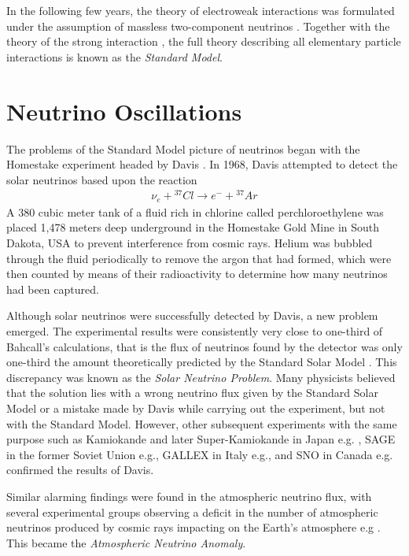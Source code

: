 \documentclass[english]{article}
\begin{document}
    In the following few years, the theory of electroweak interactions was formulated under the assumption of massless two-component neutrinos \cite{glashow1961} \cite{goldstonesalamweinberg1962} \cite{weinberg1967}. Together with the theory of the strong interaction \cite{grosswilczek1973} \cite{politzer1973}, the full theory describing all elementary particle interactions is known as the \textit{Standard Model}.

\section{Neutrino Oscillations}
	The problems of the Standard Model picture of neutrinos began with the Homestake experiment headed by Davis \cite{davis1968}. In 1968, Davis attempted to detect the solar neutrinos based upon the reaction
    \begin{gather}
    	\nu_{e} + {}^{37} Cl \rightarrow e^{-} + {}^{37} Ar
    \end{gather}
    A 380 cubic meter tank of a fluid rich in chlorine called perchloroethylene was placed 1,478 meters deep underground in the Homestake Gold Mine in South Dakota, USA to prevent interference from cosmic rays. Helium was bubbled through the fluid periodically to remove the argon that had formed, which were then counted by means of their radioactivity to determine how many neutrinos had been captured.
    
    Although solar neutrinos were successfully detected by Davis, a new problem emerged. The experimental results were consistently very close to one-third of Bahcall's calculations, that is the flux of neutrinos found by the detector was only one-third the amount theoretically predicted by the Standard Solar Model \cite{davis1998} \cite{bahcall2004}. This discrepancy was known as the \textit{Solar Neutrino Problem}. Many physicists believed that the solution lies with a wrong neutrino flux given by the Standard Solar Model or a mistake made by Davis while carrying out the experiment, but not with the Standard Model. However, other subsequent experiments with the same purpose such as Kamiokande and later Super-Kamiokande in Japan e.g.\cite{kamiokande1991} \cite{superk2016}, SAGE in the former Soviet Union e.g.\cite{sage1991}, GALLEX in Italy e.g.\cite{gallex1999}, and SNO in Canada e.g.\cite{sno2001} confirmed the results of Davis.
    
    Similar alarming findings were found in the atmospheric neutrino flux, with several experimental groups observing a deficit in the number of atmospheric neutrinos produced by cosmic rays impacting on the Earth’s atmosphere e.g\cite{hirata1998} \cite{casper1991} \cite{macro1998}. This became the \textit{Atmospheric Neutrino Anomaly}.
    
\end{document}
